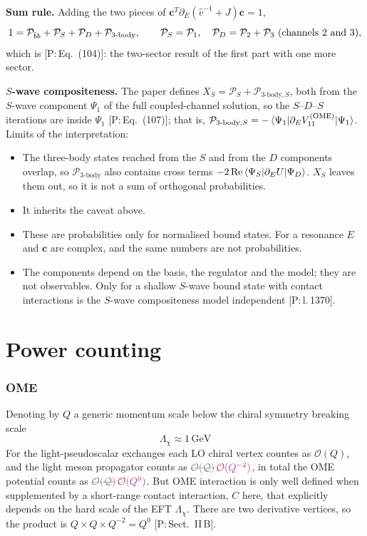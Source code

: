 \documentclass[11pt,a4paper]{article}
\newcommand{\tagP}[1]{\textcolor{blue!65!black}{\textsf{\small[P:\,#1]}}}
\renewcommand{\VOME}{V^{\rm (OME)}}
\newcommand{\Pbb}{{\cal P}_{\bar bb}}
\renewcommand{\GeV}{\,\mathrm{GeV}}
\newcommand{\ai}[1]{\textcolor{aicolor}{#1}}
\newcommand{\aifixm}[2]{\textcolor{gray}{\text{\sout{$#1$}}}\,\textcolor{aicolor}{#2}}
\newcommand{\ai}[1]{#1}
\newcommand{\aifixm}[2]{#2}
\newenvironment{aiadd}{\par}{\par}
\begin{document}
\begin{aiadd}
	\textbf{Sum rule.} Adding the two pieces of $\bm c^T\partial_E(\hat v^{-1}+J)\bm c=1$,
	\[
		1=\Pbb+\mathcal P_S+\mathcal P_D+\mathcal P_{\text{3-body}},\qquad \mathcal P_S=\mathcal P_1,\quad \mathcal P_D=\mathcal P_2+\mathcal P_3\ \text{(channels 2 and 3)},
	\]
	which is \tagP{Eq.~(104)}: the two-sector result of the first part with one more sector.

	\textbf{$S$-wave compositeness.} The paper defines $X_S=\mathcal P_S+\mathcal P_{\text{3-body},S}$, both from the $S$-wave component $\Psi_1$ of the full coupled-channel solution, so the $S$--$D$--$S$ iterations are inside $\Psi_1$ \tagP{Eq.~(107)}; that is, $\mathcal P_{\text{3-body},S}=-\braket{\Psi_1|\partial_E\VOME_{11}|\Psi_1}$. Limits of the interpretation:
	\begin{itemize}
		\item The three-body states reached from the $S$ and from the $D$ components overlap, so $\mathcal P_{\text{3-body}}$ also contains cross terms $-2\,\mathrm{Re}\braket{\Psi_S|\partial_EU|\Psi_D}$. $X_S$ leaves them out, so it is not a sum of orthogonal probabilities.
		\item It inherits the caveat above.
		\item These are probabilities only for normalised bound states. For a resonance $E$ and $\bm c$ are complex, and the same numbers are not probabilities.
		\item The components depend on the basis, the regulator and the model; they are not observables. Only for a shallow $S$-wave bound state with contact interactions is the $S$-wave compositeness model independent \tagP{l.\,1370}.
	\end{itemize}
\end{aiadd}

\clearpage
\part{Power counting}
\label{part:powercounting}
\section{OME}
Denoting by $Q$ a generic momentum scale below the chiral symmetry breaking scale
\[
	\Lambda_\chi \approx 1 \GeV
\]
For the light-pseudoscalar exchanges each LO chiral vertex countes as $\mathcal{O}(Q)$, and the light meson propagator counts as $\aifixm{\mathcal{O}(\mathcal{Q})}{\mathcal{O}(Q^{-2})}$, in total the OME potential counts as $\aifixm{\mathcal{O}(\mathcal{Q})}{\mathcal{O}(Q^0)}$. But OME interaction is only well defined when supplemented by a short-range contact interaction, $C$ here, that explicitly depends on the hard scale of the EFT $\Lambda_\chi$.
\ai{There are two derivative vertices, so the product is $Q\times Q\times Q^{-2}=Q^0$ \tagP{Sect.~II\,B}.}
\end{document}
